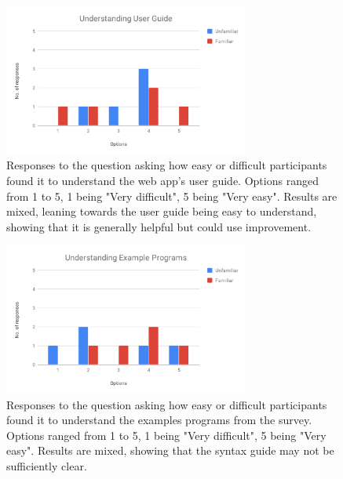 \documentclass{l4proj}
\begin{document}
\begin{figure}[H]
\centering
\includegraphics[width=0.72\textwidth]{images/UndStndGuide.pdf}
\caption{Responses to the question asking how easy or difficult participants found it to understand the web app's user guide. Options ranged from 1 to 5, 1 being "Very difficult", 5 being "Very easy". Results are mixed, leaning towards the user guide being easy to understand, showing that it is generally helpful but could use improvement.}
\label{fig:UndStndGuide}
\end{figure}

\begin{figure}[H]
\centering
\includegraphics[width=0.72\textwidth]{images/UndStndExamples.pdf}
\caption{Responses to the question asking how easy or difficult participants found it to understand the examples programs from the survey. Options ranged from 1 to 5, 1 being "Very difficult", 5 being "Very easy". Results are mixed, showing that the syntax guide may not be sufficiently clear.}
\label{fig:UndStndExamples}
\end{figure}
\end{document}
